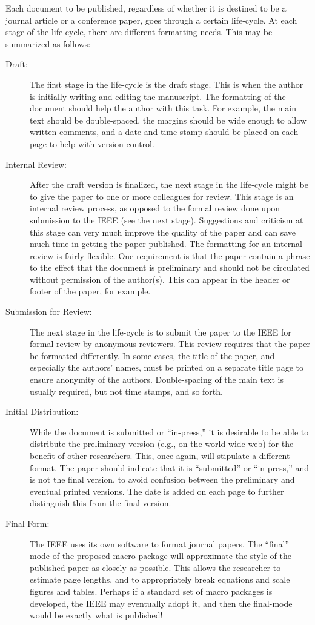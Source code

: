 \documentclass[%
	final,
	notitlepage,
	narroweqnarray,
	inline,
	twoside,
	]{ieee}
\begin{document}
Each document to be published, regardless of whether it is destined to
be a journal article or a conference paper, goes through a certain
life-cycle. At each stage of the life-cycle, there are different
formatting needs. This may be summarized as follows:
\begin{description}
\item[Draft:] The first stage in the life-cycle is the draft stage.
    This is when the author is initially writing and editing the 
    manuscript. The formatting of the document should help the author 
    with this task. For example, the main text should be
    double-spaced, the margins should be wide enough to allow written
    comments, and a date-and-time stamp should be placed on each page to 
    help with version control.
\item[Internal Review:] After the draft version is finalized,
    the next stage in the life-cycle might be to give the paper
    to one or more colleagues for review. This stage is an internal review
    process, as opposed to the formal review done upon submission
    to the IEEE (see the next stage). Suggestions and 
    criticism at this stage can very much improve the quality of the 
    paper and can save much time in getting the paper 
    published. The formatting for an internal review is fairly flexible. 
    One requirement is that the paper contain a phrase to the effect that
    the document is preliminary and should not be circulated without
    permission of the author(s).  This can appear in the header or footer of
    the paper, for example.
\item[Submission for Review:] The next stage in the life-cycle is to 
    submit the paper to the IEEE for formal review by anonymous reviewers. 
    This review requires that the paper be formatted differently. In some 
    cases, the title of the paper, and especially the authors' names, 
    must be printed on a separate title page to ensure anonymity of the
    authors. Double-spacing of the main text is usually required, but not 
    time stamps, and so forth.
\item[Initial Distribution:] While the document is submitted or 
    ``in-press,'' it is desirable to be able to distribute the 
    preliminary version (e.g., on the world-wide-web) for the 
    benefit of other researchers. This, once again, will stipulate a 
    different format. The paper should indicate that it is
    ``submitted'' or ``in-press,'' and is not the final version, to 
    avoid confusion between the preliminary and eventual printed
    versions. The date is added on each page to further distinguish this
    from the final version.
\item[Final Form:] The IEEE uses its own software to format journal
    papers. The ``final'' mode of the proposed macro package will
    approximate the style of the published paper as closely as possible.
    This allows the researcher to estimate page lengths, and to 
    appropriately break equations and scale figures and tables. Perhaps 
    if a standard set of macro packages is developed, the IEEE may 
    eventually adopt it, and then the final-mode would be exactly 
    what is published!


\end{description}
\end{document}
